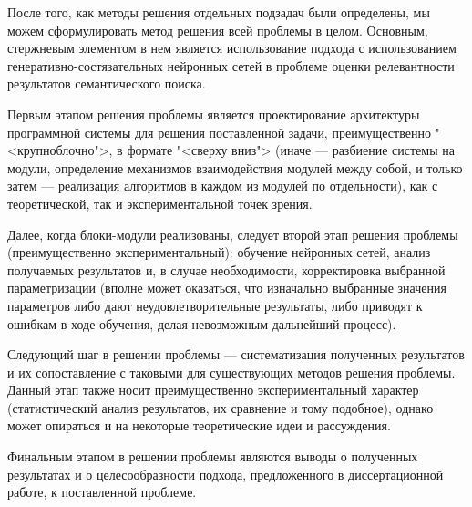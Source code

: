 После того, как методы решения отдельных подзадач были определены, мы можем сформулировать метод решения всей проблемы в целом.
Основным, стержневым элементом в нем является использование подхода с использованием генеративно-состязательных нейронных сетей
в проблеме оценки релевантности результатов семантического поиска.

Первым этапом решения проблемы является проектирование архитектуры программной системы для решения поставленной задачи,
преимущественно "<крупноблочно">, в формате "<сверху вниз"> (иначе --- разбиение системы на модули, определение механизмов
взаимодействия модулей между собой, и только затем --- реализация алгоритмов в каждом из модулей по отдельности), как с 
теоретической, так и экспериментальной точек зрения.

Далее, когда блоки-модули реализованы, следует второй этап решения проблемы (преимущественно экспериментальный): обучение
нейронных сетей, анализ получаемых результатов и, в случае необходимости, корректировка выбранной параметризации (вполне
может оказаться, что изначально выбранные значения параметров либо дают неудовлетворительные результаты, либо приводят
к ошибкам в ходе обучения, делая невозможным дальнейший процесс).

Следующий шаг в решении проблемы --- систематизация полученных результатов и их сопоставление с таковыми для существующих
методов решения проблемы. Данный этап также носит преимущественно экспериментальный характер (статистический анализ
результатов, их сравнение и тому подобное), однако может опираться и на некоторые теоретические идеи и рассуждения.

Финальным этапом в решении проблемы являются выводы о полученных результатах и о целесообразности подхода,
предложенного в диссертационной работе, к поставленной проблеме.
